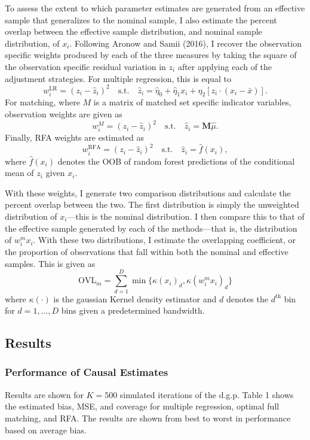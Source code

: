 \documentclass[11pt,]{article}
\begin{document}
To assess the extent to which parameter estimates are generated from an
effective sample that generalizes to the nominal sample, I also estimate
the percent overlap between the effective sample distribution, and
nominal sample distribution, of \(x_i\). Following Aronow and Samii
(2016), I recover the observation specific weights produced by each of
the three measures by taking the square of the observation specific
residual variation in \(z_i\) after applying each of the adjustment
strategies. For multiple regression, this is equal to
\[w_i^\text{LR} = (z_i - \hat{z}_i)^2 \quad \text{s.t.} \quad \hat{z}_i = \hat{\eta}_0 + \hat{\eta}_1x_i + \hat{\eta}_2[z_i\cdot(x_i - \bar{x})].\]
For matching, where \(M\) is a matrix of matched set specific indicator
variables, observation weights are given as
\[w_i^M = (z_i - \hat{z}_i)^2 \quad \text{s.t.} \quad \hat{z}_i = \mathbf{M}\hat{\mu}.\]
Finally, RFA weights are estimated as
\[w_i^\text{RFA} = (z_i - \hat{z}_i)^2 \quad \text{s.t.} \quad \hat{z}_i = \hat{f}(x_i), \]
where \(\hat{f}(x_i)\) denotes the OOB of random forest predictions of
the conditional mean of \(z_i\) given \(x_i\).

With these weights, I generate two comparison distributions and
calculate the percent overlap between the two. The first distribution is
simply the unweighted distribution of \(x_i\)---this is the nominal
distribution. I then compare this to that of the effective sample
generated by each of the methods---that is, the distribution of
\(w_i^mx_i\). With these two distributions, I estimate the overlapping
coefficient, or the proportion of observations that fall within both the
nominal and effective samples. This is given as
\[\text{OVL}_m = \sum_{d=1}^D \min\{\kappa(x_i)_d,\kappa(w_i^mx_i)_d\}\]
where \(\kappa(\cdot)\) is the gaussian Kernel density estimator and
\(d\) denotes the \(d^\text{th}\) bin for \(d = 1,...,D\) bins given a
predetermined bandwidth.

\hypertarget{results}{%
\subsection{Results}\label{results}}

\hypertarget{performance-of-causal-estimates}{%
\subsubsection{Performance of Causal
Estimates}\label{performance-of-causal-estimates}}

Results are shown for \(K = 500\) simulated iterations of the d.g.p.
Table 1 shows the estimated bias, MSE, and coverage for multiple
regression, optimal full matching, and RFA. The results are shown from
best to worst in performance based on average bias.
\end{document}
